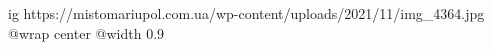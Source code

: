  
 
 
 
 

\ifcmt
  ig https://mistomariupol.com.ua/wp-content/uploads/2021/11/img_4364.jpg
  @wrap center
  @width 0.9
\fi
